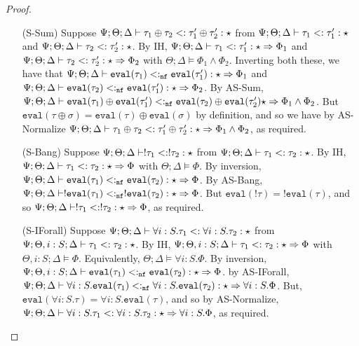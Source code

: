 \begin{proof}
\begin{itemize}
   \item[(S-Sum)] Suppose $\Psi ; \Theta ; \Delta \vdash \tau_1 \oplus \tau_2 <: \tau_1' \oplus \tau_2' : \star$ from $\Psi ; \Theta ; \Delta \vdash \tau_1 <: \tau_1' : \star$ and $\Psi ; \Theta ; \Delta \vdash \tau_2 <: \tau_2' : \star$. By IH, $\Psi ; \Theta ; \Delta \vdash \tau_1 <: \tau_1' : \star \Rightarrow \Phi_1$ and $\Psi ; \Theta ; \Delta \vdash \tau_2 <: \tau_2' : \star \Rightarrow \Phi_2$ with $\Theta ; \Delta \vDash \Phi_1 \wedge \Phi_2$. Inverting both these, we have that $\Psi ; \Theta ; \Delta \vdash \texttt{eval}(\tau_1) <:_{\texttt{nf}} \texttt{eval}(\tau_1') : \star \Rightarrow \Phi_1$ and $\Psi ; \Theta ; \Delta \vdash \texttt{eval}(\tau_2) <:_{\texttt{nf}} \texttt{eval}(\tau_1') : \star \Rightarrow \Phi_2$. By AS-Sum, $\Psi ; \Theta ; \Delta \vdash \texttt{eval}(\tau_1) \oplus \texttt{eval}(\tau_1') <:_{\texttt{nf}} \texttt{eval}(\tau_2) \oplus \texttt{eval}(\tau_2') \star \Rightarrow \Phi_1 \wedge \Phi_2$. But $\texttt{eval}(\tau \oplus \sigma) = \texttt{eval}(\tau)\oplus\texttt{eval}(\sigma)$ by definition, and so we have by AS-Normalize $\Psi ; \Theta ; \Delta \vdash \tau_1 \oplus \tau_2 <: \tau_1' \oplus \tau_2' : \star \Rightarrow \Phi_1 \wedge \Phi_2$, as required.
   \item[(S-Bang)] Suppose $\Psi ; \Theta ; \Delta \vdash !\tau_1 <: !\tau_2 : \star$ from $\Psi ; \Theta ; \Delta \vdash \tau_1 <: \tau_2 : \star$.
   By IH, $\Psi ; \Theta ; \Delta \vdash \tau_1 <: \tau_2 : \star \Rightarrow \Phi$ with $\Theta ; \Delta \vDash \Phi$. By inversion, 
   $\Psi ; \Theta ; \Delta \vdash \texttt{eval}(\tau_1) <:_{\texttt{nf}} \texttt{eval}(\tau_2) : \star \Rightarrow \Phi$. By AS-Bang, 
   $\Psi ; \Theta ; \Delta \vdash !\texttt{eval}(\tau_1) <:_{\texttt{nf}} !\texttt{eval}(\tau_2) : \star \Rightarrow \Phi$. But $\texttt{eval}(!\tau) = !\texttt{eval}(\tau)$, and so
    $\Psi ; \Theta ; \Delta \vdash !\tau_1 <: !\tau_2 : \star \Rightarrow \Phi$, as required.
   \item[(S-IForall)] Suppose $\Psi ; \Theta ; \Delta \vdash \forall i : S. \tau_1 <: \forall i : S. \tau_2 : \star$ from $\Psi ; \Theta, i : S ; \Delta \vdash \tau_1 <: \tau_2 : \star$. By IH, $\Psi ; \Theta, i : S ; \Delta \vdash \tau_1 <: \tau_2 : \star \Rightarrow \Phi$ with $\Theta, i : S ; \Delta \vDash \Phi$. Equivalently, $\Theta ; \Delta \vDash \forall i : S. \Phi$. By inversion, $\Psi ; \Theta, i : S ; \Delta \vdash \texttt{eval}(\tau_1) <:_{\texttt{nf}} \texttt{eval}(\tau_2) : \star \Rightarrow \Phi$. by AS-IForall, $\Psi ; \Theta ; \Delta \vdash \forall i : S. \texttt{eval}(\tau_1) <:_{\texttt{nf}} \forall i : S. \texttt{eval}(\tau_2) : \star \Rightarrow \forall i : S. \Phi$. But, $\texttt{eval}(\forall i : S. \tau) = \forall i : S.\texttt{eval}(\tau)$, and so by AS-Normalize, $\Psi ; \Theta ; \Delta \vdash \forall i : S. \tau_1 <: \forall i : S. \tau_2 : \star \Rightarrow \forall i : S. \Phi$, as required.

\end{itemize}
\end{proof}
